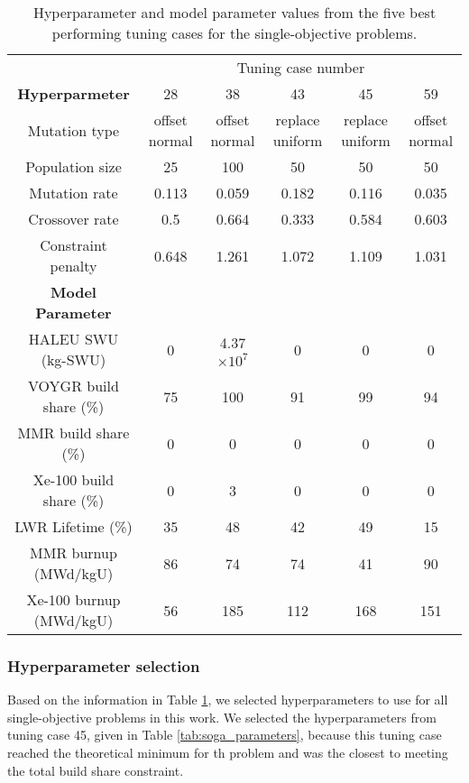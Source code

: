 \begin{table}
    \centering 
    \caption{Hyperparameter and model parameter values from the five best 
    performing tuning cases for the single-objective problems.}
    \label{tab:soga_tuning_results}
    \begin{tabular}{c c c c c c}
        \hline 
        & \multicolumn{5}{c}{Tuning case number} \\
        \textbf{Hyperparmeter} & 28 & 38 & 43 & 45 & 59 \\
        \hline 
        Mutation type & offset normal & offset normal & replace uniform &
        replace uniform & offset normal\\
        Population size & 25 & 100 & 50 & 50 & 50 \\
        Mutation rate & 0.113 & 0.059 & 0.182 & 0.116 & 0.035\\
        Crossover rate & 0.5 & 0.664 & 0.333 & 0.584 & 0.603\\
        Constraint penalty & 0.648 & 1.261 & 1.072 & 1.109 & 1.031\\
        \hline
        \textbf{Model Parameter} \\
        \gls{HALEU} \gls{SWU} (kg-SWU)& 0 & 4.37 $\times 10^7$ & 0 & 0 & 0\\
        VOYGR build share (\%) & 75 & 100 & 91 & 99 & 94\\
        \gls{MMR} build share (\%)& 0 & 0 & 0 & 0 & 0\\
        Xe-100 build share (\%) & 0 & 3 & 0 & 0 & 0\\
        LWR Lifetime (\%)& 35 & 48 & 42 & 49 & 15\\
        \gls{MMR} burnup (MWd/kgU) & 86 & 74 & 74 & 41 & 90\\
        Xe-100 burnup (MWd/kgU) & 56 & 185 & 112 & 168 & 151\\
        \hline 
        
        
    \end{tabular}
\end{table}

\subsubsection{Hyperparameter selection}
Based on the information in Table \ref{tab:soga_tuning_results}, we 
selected hyperparameters to use for all single-objective problems in this 
work. We selected the hyperparameters from tuning case 45, given in 
Table \ref{tab:soga_parameters}, because this tuning case reached the 
theoretical minimum for th problem and was the closest to meeting 
the total build share constraint. 

